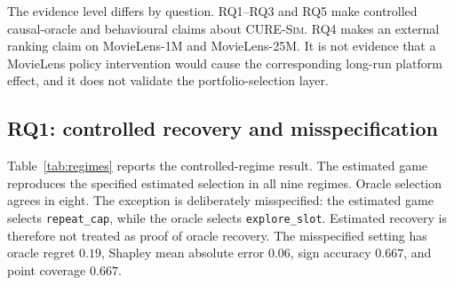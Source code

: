 \documentclass[pdflatex,sn-mathphys-num]{sn-jnl}
\theoremstyle{thmstyleone}
\theoremstyle{thmstyletwo}
\theoremstyle{thmstylethree}
\newcommand{\Sim}{\textsc{CURE-Sim}}
\begin{document}
The evidence level differs by question. RQ1--RQ3 and RQ5 make controlled causal-oracle and behavioural claims about \Sim{}. RQ4 makes an external ranking claim on MovieLens-1M and MovieLens-25M. It is not evidence that a MovieLens policy intervention would cause the corresponding long-run platform effect, and it does not validate the portfolio-selection layer.

\subsection{RQ1: controlled recovery and misspecification}\label{sec:rq1}

Table~\ref{tab:regimes} reports the controlled-regime result. The estimated game reproduces the specified estimated selection in all nine regimes. Oracle selection agrees in eight. The exception is deliberately misspecified: the estimated game selects \texttt{repeat\_cap}, while the oracle selects \texttt{explore\_slot}. Estimated recovery is therefore not treated as proof of oracle recovery. The misspecified setting has oracle regret $0.19$, Shapley mean absolute error $0.06$, sign accuracy $0.667$, and point coverage $0.667$.

\begin{table}[t]
\caption{Controlled oracle-regime validation. ``Estimated match'' compares the selected estimated-game portfolio with the declared estimated target; ``oracle match'' compares it with the true-game portfolio.}\label{tab:regimes}
\centering
\scriptsize
\setlength{\tabcolsep}{3pt}
\end{table}
\end{document}
